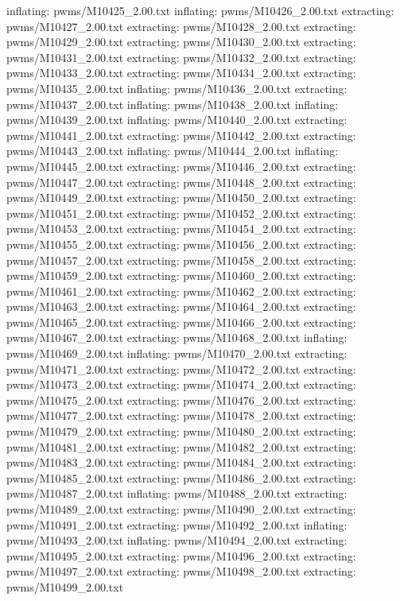 \documentclass[letterpaper,10pt,english]{sphinxmanual}
\begin{document}
{\begin{sphinxVerbatim}[commandchars=\\\{\}]
  inflating: pwms/M10425\_2.00.txt
  inflating: pwms/M10426\_2.00.txt
 extracting: pwms/M10427\_2.00.txt
 extracting: pwms/M10428\_2.00.txt
 extracting: pwms/M10429\_2.00.txt
 extracting: pwms/M10430\_2.00.txt
 extracting: pwms/M10431\_2.00.txt
 extracting: pwms/M10432\_2.00.txt
 extracting: pwms/M10433\_2.00.txt
 extracting: pwms/M10434\_2.00.txt
 extracting: pwms/M10435\_2.00.txt
  inflating: pwms/M10436\_2.00.txt
 extracting: pwms/M10437\_2.00.txt
  inflating: pwms/M10438\_2.00.txt
  inflating: pwms/M10439\_2.00.txt
  inflating: pwms/M10440\_2.00.txt
 extracting: pwms/M10441\_2.00.txt
 extracting: pwms/M10442\_2.00.txt
 extracting: pwms/M10443\_2.00.txt
  inflating: pwms/M10444\_2.00.txt
  inflating: pwms/M10445\_2.00.txt
 extracting: pwms/M10446\_2.00.txt
 extracting: pwms/M10447\_2.00.txt
 extracting: pwms/M10448\_2.00.txt
 extracting: pwms/M10449\_2.00.txt
 extracting: pwms/M10450\_2.00.txt
 extracting: pwms/M10451\_2.00.txt
 extracting: pwms/M10452\_2.00.txt
 extracting: pwms/M10453\_2.00.txt
 extracting: pwms/M10454\_2.00.txt
 extracting: pwms/M10455\_2.00.txt
 extracting: pwms/M10456\_2.00.txt
 extracting: pwms/M10457\_2.00.txt
 extracting: pwms/M10458\_2.00.txt
 extracting: pwms/M10459\_2.00.txt
 extracting: pwms/M10460\_2.00.txt
 extracting: pwms/M10461\_2.00.txt
 extracting: pwms/M10462\_2.00.txt
 extracting: pwms/M10463\_2.00.txt
 extracting: pwms/M10464\_2.00.txt
 extracting: pwms/M10465\_2.00.txt
 extracting: pwms/M10466\_2.00.txt
 extracting: pwms/M10467\_2.00.txt
 extracting: pwms/M10468\_2.00.txt
  inflating: pwms/M10469\_2.00.txt
  inflating: pwms/M10470\_2.00.txt
 extracting: pwms/M10471\_2.00.txt
 extracting: pwms/M10472\_2.00.txt
 extracting: pwms/M10473\_2.00.txt
 extracting: pwms/M10474\_2.00.txt
 extracting: pwms/M10475\_2.00.txt
 extracting: pwms/M10476\_2.00.txt
 extracting: pwms/M10477\_2.00.txt
 extracting: pwms/M10478\_2.00.txt
 extracting: pwms/M10479\_2.00.txt
 extracting: pwms/M10480\_2.00.txt
 extracting: pwms/M10481\_2.00.txt
 extracting: pwms/M10482\_2.00.txt
 extracting: pwms/M10483\_2.00.txt
 extracting: pwms/M10484\_2.00.txt
 extracting: pwms/M10485\_2.00.txt
 extracting: pwms/M10486\_2.00.txt
 extracting: pwms/M10487\_2.00.txt
  inflating: pwms/M10488\_2.00.txt
 extracting: pwms/M10489\_2.00.txt
 extracting: pwms/M10490\_2.00.txt
 extracting: pwms/M10491\_2.00.txt
 extracting: pwms/M10492\_2.00.txt
  inflating: pwms/M10493\_2.00.txt
  inflating: pwms/M10494\_2.00.txt
 extracting: pwms/M10495\_2.00.txt
 extracting: pwms/M10496\_2.00.txt
 extracting: pwms/M10497\_2.00.txt
 extracting: pwms/M10498\_2.00.txt
 extracting: pwms/M10499\_2.00.txt

\end{sphinxVerbatim}}
\end{document}

